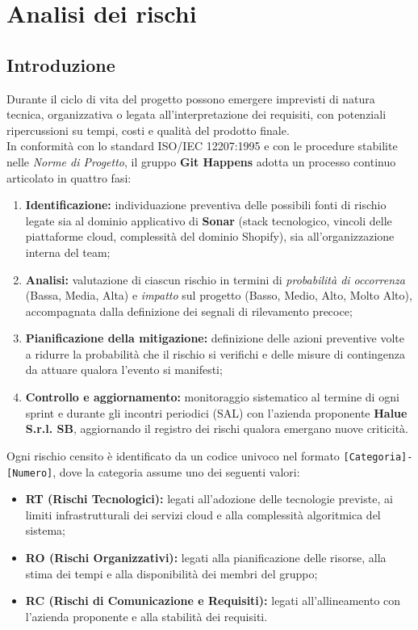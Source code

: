 \newpage
\vspace{0.8cm}

\section{Analisi dei rischi}

\subsection{Introduzione}
Durante il ciclo di vita del progetto possono emergere imprevisti di natura tecnica, organizzativa o legata all'interpretazione dei requisiti, con potenziali ripercussioni su tempi, costi e qualità del prodotto finale. \\
In conformità con lo standard ISO/IEC 12207:1995 e con le procedure stabilite nelle \textit{Norme di Progetto}, il gruppo \textbf{Git Happens} adotta un processo continuo articolato in quattro fasi:
\begin{enumerate}
    \item \textbf{Identificazione:} individuazione preventiva delle possibili fonti di rischio legate sia al dominio applicativo di \textbf{Sonar} (stack tecnologico, vincoli delle piattaforme cloud, complessità del dominio Shopify), sia all'organizzazione interna del team;
    \item \textbf{Analisi:} valutazione di ciascun rischio in termini di \textit{probabilità di occorrenza} (Bassa, Media, Alta) e \textit{impatto} sul progetto (Basso, Medio, Alto, Molto Alto), accompagnata dalla definizione dei segnali di rilevamento precoce;
    \item \textbf{Pianificazione della mitigazione:} definizione delle azioni preventive volte a ridurre la probabilità che il rischio si verifichi e delle misure di contingenza da attuare qualora l'evento si manifesti;
    \item \textbf{Controllo e aggiornamento:} monitoraggio sistematico al termine di ogni sprint e durante gli incontri periodici (SAL) con l'azienda proponente \textbf{Halue S.r.l. SB}, aggiornando il registro dei rischi qualora emergano nuove criticità.
\end{enumerate}

Ogni rischio censito è identificato da un codice univoco nel formato \texttt{[Categoria]-[Numero]}, dove la categoria assume uno dei seguenti valori:
\begin{itemize}
    \item \textbf{RT (Rischi Tecnologici):} legati all'adozione delle tecnologie previste, ai limiti infrastrutturali dei servizi cloud e alla complessità algoritmica del sistema;
    \item \textbf{RO (Rischi Organizzativi):} legati alla pianificazione delle risorse, alla stima dei tempi e alla disponibilità dei membri del gruppo;
    \item \textbf{RC (Rischi di Comunicazione e Requisiti):} legati all'allineamento con l'azienda proponente e alla stabilità dei requisiti.
\end{itemize}

